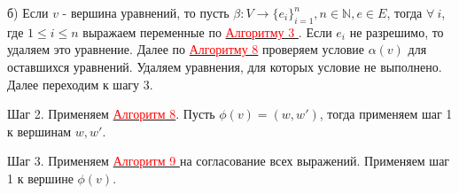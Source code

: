 \documentclass[12pt]{article}
\begin{document}
     б) Если $v$ - вершина уравнений, то пусть $\beta : V \rightarrow \lbrace  e_{i}  \rbrace_{i=1}^{n}, n \in \mathbb{N}, e \in E$, тогда $\forall \: i$, где $ 1 \leq i \leq n$ выражаем переменные по \hyperlink{a3}{ \textcolor{red}{Алгоритму 3 }}. Если $e_{i} $ не разрешимо, то удаляем это уравнение. Далее по \hyperlink{a8}{ \textcolor{red}{Алгоритму 8}} проверяем условие $\alpha(v)$ для оставшихся уравнений. Удаляем уравнения, для которых условие не выполнено. Далее переходим к шагу 3.
          
     Шаг 2. Применяем  \hyperlink{a8}{ \textcolor{red}{Алгоритм 8}}. Пусть $\phi(v)=(w,w')$, тогда применяем шаг 1 к вершинам $w, w'$.
     
     Шаг 3. Применяем  \hyperlink{a9}{ \textcolor{red}{Алгоритм 9 }} на согласование  всех выражений. Применяем шаг 1 к вершине $\phi(v)$.
     
     
     
     
     
\end{document}

